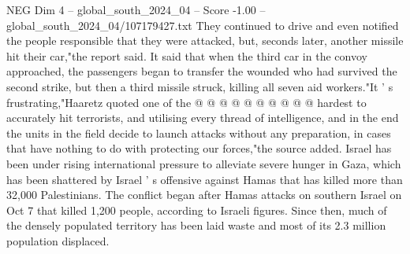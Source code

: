 \begin{textsample}{NEG Dim 4 – global\_south\_2024\_04 – Score -1.00 – global\_south\_2024\_04/107179427.txt}
They continued to drive and even notified the people responsible that they were attacked, but, seconds later, another missile hit their car,"the report said.
It said that when the third car in the convoy approached, the passengers began to transfer the wounded who had survived the second strike, but then a third missile struck, killing all seven aid workers."It ' s frustrating,"Haaretz quoted one of the @ @ @ @ @ @ @ @ @ @ hardest to accurately hit terrorists, and utilising every thread of intelligence, and in the end the units in the field decide to launch attacks without any preparation, in cases that have nothing to do with protecting our forces,"the source added.
Israel has been under rising international pressure to alleviate severe hunger in Gaza, which has been shattered by Israel ' s offensive against Hamas that has killed more than 32,000 Palestinians.
The conflict began after Hamas attacks on southern Israel on Oct 7 that killed 1,200 people, according to Israeli figures.
Since then, much of the densely populated territory has been laid waste and most of its 2.3 million population displaced.

\end{textsample}
